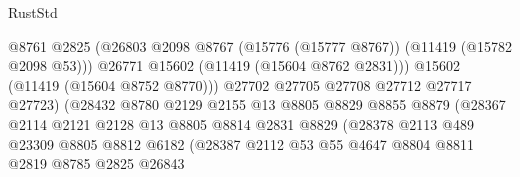 \begin{lexlean}{RustStd}
\begin{coremodule}
                                          @8761
                                          @2825
                                          (@26803
                                            @2098
                                            @8767
                                            (@15776 (@15777 @8767))
                                            (@11419 (@15782 @2098 @53)))
                                          @26771
                                          @15602
                                          (@11419 (@15604 @8762 @2831)))
                                        @15602
                                        (@11419 (@15604 @8752 @8770)))
                                      @27702
                                      @27705
                                      @27708
                                      @27712
                                      @27717
                                      @27723)
                                    (@28432
                                      @8780
                                      @2129
                                      @2155
                                      @13
                                      @8805
                                      @8829
                                      @8855
                                      @8879
                                      (@28367
                                        @2114
                                        @2121
                                        @2128
                                        @13
                                        @8805
                                        @8814
                                        @2831
                                        @8829
                                        (@28378
                                          @2113
                                          @489
                                          @23309
                                          @8805
                                          @8812
                                          @6182
                                          (@28387
                                            @2112
                                            @53
                                            @55
                                            @4647
                                            @8804
                                            @8811
                                            @2819
                                            @8785
                                            @2825
                                            @26843

\end{coremodule}
\end{lexlean}
